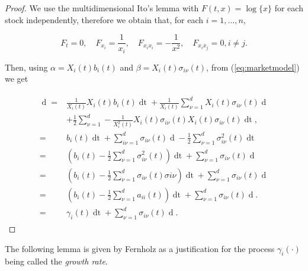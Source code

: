 \documentclass[british]{amsart} \usepackage{lmodern}
\numberwithin{equation}{section} \numberwithin{figure}{section}
\theoremstyle{plain} \newtheorem{thm}{\protect\theoremname}[section]
\theoremstyle{definition} \newtheorem{defn}[thm]{\protect\definitionname}
\theoremstyle{plain} \newtheorem{assumption}[thm]{\protect\assumptionname}
\theoremstyle{plain} \newtheorem{lem}[thm]{\protect\lemmaname}
\theoremstyle{plain} \newtheorem{prop}[thm]{\protect\propositionname}
\theoremstyle{remark} \newtheorem{rem}[thm]{\protect\remarkname}
\theoremstyle{plain} \newtheorem{cor}[thm]{\protect\corollaryname}
\renewcommand{\d}[1]{\mathop{\mathrm{d}{#1}}}
\newcommand{\rangei}{i=1,\dots,n} \newcommand{\measure}{\mathbb{P}}
\begin{document}
\begin{proof}

  We use the multidimensional Ito's lemma with $F(t,x)=\log\{x\}$ for each stock
  independently, therefore we obtain that, for each $\rangei$,

  \begin{equation}
    F_{t}=0, \quad F_{x_{i}}=\frac{1}{x_{i}}, \quad 
    F_{x_{i}x_{i}}=-\frac{1}{x^2}, \quad F_{x_{i}x_{j}}=0, i \neq j.
  \end{equation}

  Then, using $\alpha=X_{i}(t)b_{i}(t)$ and $\beta=X_{i}(t)\sigma_{i\nu}(t)$, 
  from (\ref{eq:marketmodel}) we get

  \begin{gather}
    \begin{split}
    \d{\log{X_{i}(t)}} 
        =& \frac{1}{X_{i}(t)} X_{i}(t)b_{i}(t)\d{t} 
            + \frac{1}{X_{i}(t)} \sum_{\nu=1}^d X_{i}(t)\sigma_{i\nu}(t)\d{W_{\nu}(t)} \\ 
        &
            + \frac{1}{2} \sum_{\nu=1}^d -\frac{1}{X_{i}^2(t)} X_{i}(t)\sigma_{i\nu}(t) X_{i}(t)\sigma_{i\nu}(t) \d{t},\\
        =& b_{i}(t)\d{t} 
            + \sum_{i\nu=1}^d \sigma_{i\nu}(t) \d{W_{\nu}(t)}
            - \frac{1}{2} \sum_{\nu=1}^d \sigma^2_{i\nu}(t) \d{t} \\
        =& \left( b_{i}(t) - \frac{1}{2} \sum_{\nu=1}^d \sigma^2_{i\nu}(t) \right) \d{t} 
            + \sum_{\nu=1}^d \sigma_{i\nu}(t) \d{W_{\nu}(t)}\\
        =& \left( b_{i}(t) - \frac{1}{2} \sum_{\nu=1}^d \sigma_{i\nu}(t) \sigma{i\nu} \right) \d{t} 
            + \sum_{\nu=1}^d \sigma_{i\nu}(t) \d{W_{\nu}(t)}\\
        =& \left( b_{i}(t) - \frac{1}{2} \sum_{\nu=1}^d a_{ii}(t) \right) \d{t} 
            + \sum_{\nu=1}^d \sigma_{i\nu}(t) \d{W_{\nu}(t)}.\\
        =& \gamma_{i}(t) \d{t} + \sum_{\nu=1}^d \sigma_{i\nu}(t) \d{W_{\nu}(t)}.
   \end{split}
  \end{gather}

\end{proof}

The following lemma is given by Fernholz \cite{fernholz2009}
as a justification for the process $\gamma_{i}(\cdot)$ being called the
\textit{growth rate}.
\end{document}
